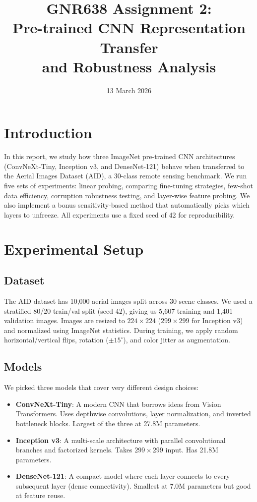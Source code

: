 \documentclass[11pt,a4paper]{article}
\title{\textbf{GNR638 Assignment 2:\\Pre-trained CNN Representation Transfer\\and Robustness Analysis}}
\author{}
\date{13 March 2026}
\begin{document}
\maketitle

\section{Introduction}

In this report, we study how three ImageNet pre-trained CNN architectures (ConvNeXt-Tiny, Inception v3, and DenseNet-121) behave when transferred to the Aerial Images Dataset (AID), a 30-class remote sensing benchmark.
We run five sets of experiments: linear probing, comparing fine-tuning strategies, few-shot data efficiency, corruption robustness testing, and layer-wise feature probing.
We also implement a bonus sensitivity-based method that automatically picks which layers to unfreeze.
All experiments use a fixed seed of 42 for reproducibility.

\section{Experimental Setup}

\subsection{Dataset}

The AID dataset has 10,000 aerial images split across 30 scene classes.
We used a stratified 80/20 train/val split (seed 42), giving us 5,607 training and 1,401 validation images.
Images are resized to $224 \times 224$ ($299 \times 299$ for Inception v3) and normalized using ImageNet statistics.
During training, we apply random horizontal/vertical flips, rotation ($\pm15^{\circ}$), and color jitter as augmentation.

\subsection{Models}

We picked three models that cover very different design choices:

\begin{itemize}[nosep]
  \item \textbf{ConvNeXt-Tiny}: A modern CNN that borrows ideas from Vision Transformers. Uses depthwise convolutions, layer normalization, and inverted bottleneck blocks. Largest of the three at 27.8M parameters.
  \item \textbf{Inception v3}: A multi-scale architecture with parallel convolutional branches and factorized kernels. Takes $299 \times 299$ input. Has 21.8M parameters.
  \item \textbf{DenseNet-121}: A compact model where each layer connects to every subsequent layer (dense connectivity). Smallest at 7.0M parameters but good at feature reuse.
\end{itemize}
\end{document}
